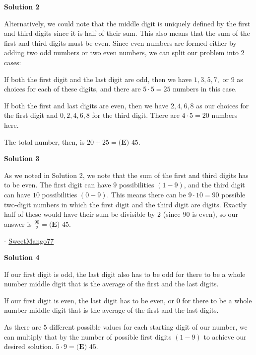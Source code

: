 \begin{enumerate}
 



\textbf{Solution 2}

Alternatively, we could note that the middle digit is uniquely defined by the first and third digits since it is half of their sum. This also means that the sum of the first and third digits must be even. Since even numbers are formed either by adding two odd numbers or two even numbers, we can split our problem into $2$ cases:

 If both the first digit and the last digit are odd, then we have $1, 3, 5, 7,$ or $9$ as choices for each of these digits, and there are $5\cdot5=25$ numbers in this case.

 If both the first and last digits are even, then we have $2, 4, 6, 8$ as our choices for the first digit and $0, 2, 4, 6, 8$ for the third digit. There are $4\cdot5=20$ numbers here.

 The total number, then, is $20+25=\boxed{\textbf{(E) } 45}$.

 



\textbf{Solution 3}

As we noted in Solution 2, we note that the sum of the first and third digits has to be even. The first digit can have $9$ possibilities $(1-9)$, and the third digit can have $10$ possibilities $(0-9)$. This means there can be $9\cdot10=90$ possible two-digit numbers in which the first digit and the third digit are digits. Exactly half of these would have their sum be divisible by $2$ (since $90$ is even), so our answer is $\frac{90}{2}=\boxed{\textbf{(E) }45}$.

 - \href{https://artofproblemsolving.com/wiki/index.php?title=User:Sweetmango77}{SweetMango77}

 



\textbf{Solution 4}

If our first digit is odd, the last digit also has to be odd for there to be a whole number middle digit that is the average of the first and the last digits.

 If our first digit is even, the last digit has to be even, or $0$ for there to be a whole number middle digit that is the average of the first and the last digits.

 As there are $5$ different possible values for each starting digit of our number, we can multiply that by the number of possible first digits $(1-9)$ to achieve our desired solution. $5 \cdot 9 = \boxed{\textbf{(E) }45}$.


\end{enumerate}
